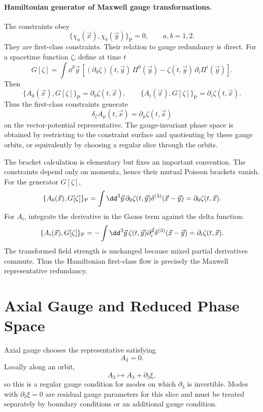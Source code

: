 \paragraph{Hamiltonian generator of Maxwell gauge transformations.}
The constraints obey
\[
  \{\chi_a(\vec x),\chi_b(\vec y)\}_{\mathrm P}=0,
  \qquad
  a,b=1,2.
\]
They are first-class constraints. Their relation to gauge redundancy is
direct. For a spacetime function \(\zeta\), define at time \(t\)
\[
  G[\zeta]
  =
  \int\dd^3\vec y\,
  \left[
    (\partial_0\zeta)(t,\vec y)\,\Pi^0(\vec y)
    -
    \zeta(t,\vec y)\,\partial_i\Pi^i(\vec y)
  \right].
\]
Then
\[
  \{A_0(\vec x),G[\zeta]\}_{\mathrm P}
  =
  \partial_0\zeta(t,\vec x),
  \qquad
  \{A_i(\vec x),G[\zeta]\}_{\mathrm P}
  =
  \partial_i\zeta(t,\vec x).
\]
Thus the first-class constraints generate
\[
  \delta_\zeta A_\mu(t,\vec x)=\partial_\mu\zeta(t,\vec x)
\]
on the vector-potential representative. The gauge-invariant phase space is
obtained by restricting to the constraint surface and quotienting by these
gauge orbits, or equivalently by choosing a regular slice through the orbits.

The bracket calculation is elementary but fixes an important convention.  The
constraints depend only on momenta, hence their mutual Poisson brackets
vanish.  For the generator \(G[\zeta]\),
\[
  \{A_0(\vec x),G[\zeta]\}_{\rm P}
  =
  \int\dd^3\vec y\,\partial_0\zeta(t,\vec y)
  \delta^{(3)}(\vec x-\vec y)
  =
  \partial_0\zeta(t,\vec x).
\]
For \(A_i\), integrate the derivative in the Gauss term against the delta
function:
\[
  \{A_i(\vec x),G[\zeta]\}_{\rm P}
  =
  -\int\dd^3\vec y\,\zeta(t,\vec y)
  \partial_i^{\vec y}\delta^{(3)}(\vec x-\vec y)
  =
  \partial_i\zeta(t,\vec x).
\]
The transformed field strength is unchanged because mixed partial
derivatives commute.  Thus the Hamiltonian first-class flow is precisely the
Maxwell representative redundancy.

\section{Axial Gauge and Reduced Phase Space}

\begin{definition}
\label{def:axial-gauge-local-chart}
Axial gauge chooses the representative satisfying
\[
  A_3=0 .
\]
Locally along an orbit,
\[
  A_3\longmapsto A_3+\partial_3\xi,
\]
so this is a regular gauge condition for modes on which \(\partial_3\) is
invertible. Modes with \(\partial_3\xi=0\) are residual gauge parameters for
this slice and must be treated separately by boundary conditions or an
additional gauge condition.
\end{definition}

